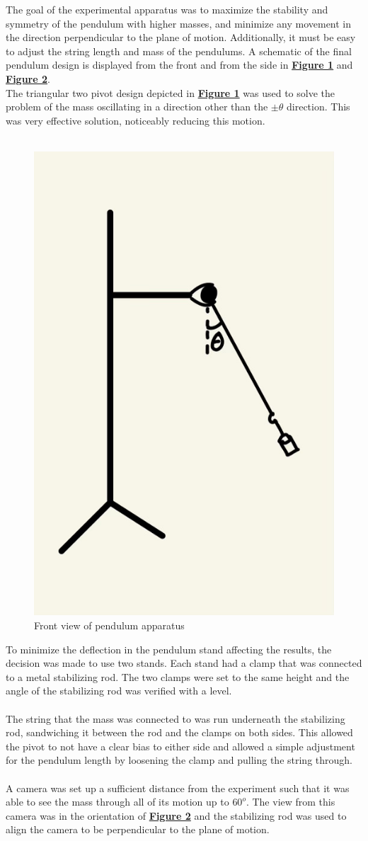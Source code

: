 \documentclass[
	letterpaper
	12pt
]{template}
\newcommand{\bref}[2]{\textbf{\hyperref[#1]{#2}}}
\begin{document}
The goal of the experimental apparatus was to maximize the stability and symmetry of the pendulum with higher masses, and minimize any movement in the direction perpendicular to the plane of motion. Additionally, it must be easy to adjust the string length and mass of the pendulums. A schematic of the final pendulum design is displayed from the front and from the side in \bref{side}{Figure 1} and \bref{front}{Figure 2}.\\


The triangular two pivot design depicted in \bref{front}{Figure 1} was used to solve the problem of the mass oscillating in a direction other than the $\pm \theta$ direction. This was very effective solution, noticeably reducing this motion.\\\\

\begin{figure}\label{front}
	\includegraphics[width=.2\textwidth]{img/front.jpg}
	\caption{Front view of pendulum apparatus}
	\vspace{10pt}
\end{figure}


To minimize the deflection in the pendulum stand affecting the results, the decision was made to use two stands. Each stand had a clamp that was connected to a metal stabilizing rod. The two clamps were set to the same height and the angle of the stabilizing rod was verified with a level.\\\\


The string that the mass was connected to was run underneath the stabilizing rod, sandwiching it between the rod and the clamps on both sides. This allowed the pivot to not have a clear bias to either side and allowed a simple adjustment for the pendulum length by loosening the clamp and pulling the string through.\\\\

A camera was set up a sufficient distance from the experiment such that it was able to see the mass through all of its motion up to $60^o$. The view from this camera was in the orientation of \bref{front}{Figure 2} and the stabilizing rod was used to align the camera to be perpendicular to the plane of motion.
\end{document}
